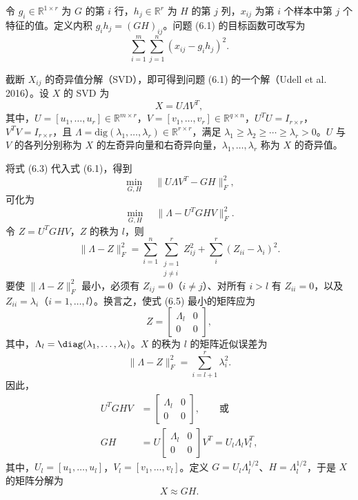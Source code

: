 令 $g_i\in\mathbb R^{1\times r}$ 为 $G$ 的第 $i$ 行，$h_j\in\mathbb R^r$ 为 $H$ 的第 $j$ 列，$x_{ij}$ 为第 $i$ 个样本中第 $j$ 个特征的值。定义内积 $g_ih_j=(GH)_{ij}$。问题 (6.1) 的目标函数可改写为
\begin{equation}
\sum_{i=1}^m\sum_{j=1}^n(x_{ij}-g_ih_j)^2.
\tag{6.2}
\end{equation}


截断 $X_{ij}$ 的奇异值分解（SVD），即可得到问题 (6.1) 的一个解（Udell et al. 2016）。设 $X$ 的 SVD 为
\begin{equation}
X=U\Lambda V^T,
\tag{6.3}
\end{equation}
其中，$U=[u_1,\ldots,u_r]\in\mathbb R^{m\times r}$，$V=[v_1,\ldots,v_r]\in\mathbb R^{q\times n}$，$U^TU=I_{r\times r}$，$V^TV=I_{r\times r}$，且 $\Lambda=\mathrm{dig}(\lambda_1,\ldots,\lambda_r)\in\mathbb R^{r\times r}$，满足 $\lambda_1\geq\lambda_2\geq\cdots\geq\lambda_r>0$。$U$ 与 $V$ 的各列分别称为 $X$ 的左奇异向量和右奇异向量，$\lambda_1,\ldots,\lambda_r$ 称为 $X$ 的奇异值。

将式 (6.3) 代入式 (6.1)，得到
\[
\min_{G,H}\quad\lVert U\Lambda V^T-GH\rVert_F^2,
\]
可化为
\begin{equation}
\min_{G,H}\quad\lVert\Lambda-U^TGHV\rVert_F^2.
\tag{6.4}
\end{equation}
令 $Z=U^TGHV$，$Z$ 的秩为 $l$，则
\begin{equation}
\lVert\Lambda-Z\rVert_F^2
=\sum_{i=1}^n\sum_{\substack{j=1\\j\ne i}}^rZ_{ij}^2+\sum_i^r(Z_{ii}-\lambda_i)^2.
\tag{6.5}
\end{equation}
要使 $\lVert\Lambda-Z\rVert_F^2$ 最小，必须有 $Z_{ij}=0$（$i\ne j$）、对所有 $i>l$ 有 $Z_{ii}=0$，以及 $Z_{ii}=\lambda_i$（$i=1,\ldots,l$）。换言之，使式 (6.5) 最小的矩阵应为
\[
Z=\begin{bmatrix}\Lambda_l&0\\0&0\end{bmatrix},
\]
其中，$\Lambda_l=\diag(\lambda_1,\ldots,\lambda_l)$。$X$ 的秩为 $l$ 的矩阵近似误差为
\begin{equation}
\lVert\Lambda-Z\rVert_F^2=\sum_{i=l+1}^r\lambda_i^2.
\tag{6.6}
\end{equation}
因此，
\begin{equation}
\begin{aligned}
U^TGHV&=\begin{bmatrix}\Lambda_l&0\\0&0\end{bmatrix},\qquad\text{或}\\
GH&=U\begin{bmatrix}\Lambda_l&0\\0&0\end{bmatrix}V^T=U_l\Lambda_lV_l^T,
\end{aligned}
\tag{6.7}
\end{equation}
其中，$U_l=[u_1,\ldots,u_l]$，$V_l=[v_1,\ldots,v_l]$。定义 $G=U_l\Lambda_l^{1/2}$、$H=\Lambda_l^{1/2}$，于是 $X$ 的矩阵分解为
\begin{equation}
X\approx GH.
\tag{6.8}
\end{equation}

